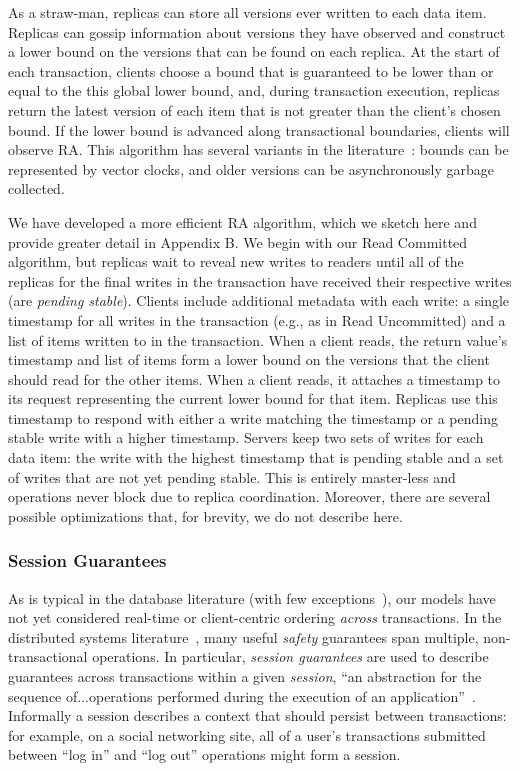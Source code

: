As a straw-man, replicas can store all versions ever written to each
data item. Replicas can gossip information about versions they have
observed and construct a lower bound on the versions that can be found
on each replica. At the start of each transaction, clients choose a
bound that is guaranteed to be lower than or equal to the this global
lower bound, and, during transaction execution, replicas return the
latest version of each item that is not greater than the client's
chosen bound. If the lower bound is advanced along transactional
boundaries, clients will observe RA. This algorithm has several
variants in the literature~\cite{readonly, swift}: bounds can be
represented by vector clocks, and older versions can be asynchronously
garbage collected.

We have developed a more efficient RA algorithm, which we sketch here
and provide greater detail in Appendix B. We begin with our Read
Committed algorithm, but replicas wait to reveal new writes to readers
until all of the replicas for the final writes in the transaction have
received their respective writes (are \textit{pending
  stable}). Clients include additional metadata with each write: a
single timestamp for all writes in the transaction (e.g., as in Read
Uncommitted) and a list of items written to in the transaction. When a
client reads, the return value's timestamp and list of items form a
lower bound on the versions that the client should read for the other
items. When a client reads, it attaches a timestamp to its request
representing the current lower bound for that item. Replicas use this
timestamp to respond with either a write matching the timestamp or a
pending stable write with a higher timestamp. Servers keep two sets of
writes for each data item: the write with the highest timestamp that
is pending stable and a set of writes that are not yet pending
stable. This is entirely master-less and operations never block due to
replica coordination. Moreover, there are several possible
optimizations that, for brevity, we do not describe here.



\subsubsection{Session Guarantees}

As is typical in the database literature (with few
exceptions~\cite{daudjee-session}), our models have not yet considered
real-time or client-centric ordering \textit{across} transactions. In
the distributed systems literature~\cite{sessionguarantees, vogels-defs}, many
useful \textit{safety} guarantees span multiple, non-transactional
operations. In particular, \textit{session guarantees} are used to
describe guarantees across transactions within a given
\textit{session}, ``an abstraction for the sequence of...operations
performed during the execution of an
application''~\cite{sessionguarantees}. Informally a session describes
a context that should persist between transactions: for example, on a
social networking site, all of a user's transactions submitted between
``log in'' and ``log out'' operations might form a session.

